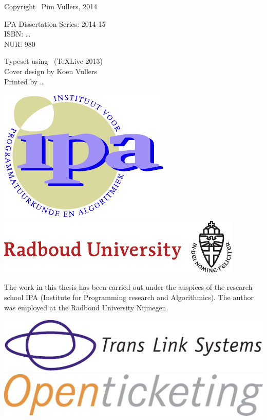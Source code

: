 \thispagestyle{empty}

\noindent
Copyright \textcopyright\ Pim Vullers, 2014 \\\null

\noindent
IPA Dissertation Series: 2014-15 \\
ISBN: \dots \\
NUR: 980 \\\null

\noindent 
Typeset using \LaTeXe\ (\TeX Live 2013) \\
Cover design by Koen Vullers \\
Printed by \dots \\\null

\vspace{40mm}

\begin{center}
\includegraphics[scale=.7,valign=M,raise=.5ex]{images/ipalogo}
\qquad
\includegraphics[valign=M,raise=.5ex]{images/radboudlogo}
\end{center}

\noindent
The work in this thesis has been carried out under the auspices of the research school IPA (Institute for Programming research and Algorithmics).
The author was employed at the Radboud University Nijmegen.

\vspace{15mm}

\begin{center}
\includegraphics[width=.45\textwidth,valign=M,raise=.5ex]{images/tlslogo}
\qquad
\includegraphics[width=.45\textwidth,valign=M,raise=.5ex]{images/openticketinglogo}
\end{center}

